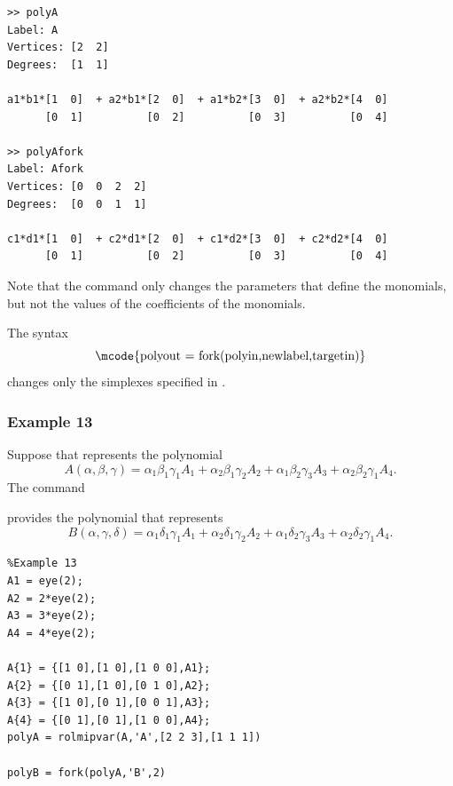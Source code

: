 \documentclass[english,11pt]{article}
\theoremstyle{break} \theorembodyfont{\small\rm}
\begin{document}
\begin{minipage}{14.5cm}
\begin{lstlisting}[rulecolor=\color{red}]
>> polyA
Label: A
Vertices: [2  2]
Degrees:  [1  1]

a1*b1*[1  0]  + a2*b1*[2  0]  + a1*b2*[3  0]  + a2*b2*[4  0]
      [0  1]          [0  2]          [0  3]          [0  4]

>> polyAfork
Label: Afork
Vertices: [0  0  2  2]
Degrees:  [0  0  1  1]

c1*d1*[1  0]  + c2*d1*[2  0]  + c1*d2*[3  0]  + c2*d2*[4  0]
      [0  1]          [0  2]          [0  3]          [0  4]
\end{lstlisting}
\end{minipage}
\vspace{0.2cm}


Note that the command  only changes the parameters that define the monomials, but not the
values of the coefficients of the monomials.

The syntax
\[
\mbox{\mcode{polyout = fork(polyin,newlabel,targetin)}}
\]
changes only the simplexes specified in .

\subsubsection*{Example 13}
Suppose that  represents the polynomial
\[
 A(\alpha,\beta,\gamma) = \alpha_1 \beta_1 \gamma_1 A_1 + \alpha_2 \beta_1 \gamma_2 A_2  + \alpha_1 \beta_2 \gamma_3 A_3 + \alpha_2 \beta_2 \gamma_1 A_4.
\]
The command

\vspace{0.5cm}%
\noindent\begin{minipage}{\linewidth}
\end{minipage}
\vspace{0.2cm}

provides the polynomial 
that represents
\[
 B(\alpha,\gamma,\delta) = \alpha_1 \delta_1 \gamma_1 A_1 + \alpha_2 \delta_1 \gamma_2 A_2  + \alpha_1 \delta_2 \gamma_3 A_3 + \alpha_2 \delta_2 \gamma_1 A_4.
\]

\begin{minipage}{9.5cm}
 \begin{lstlisting}
%Example 13
A1 = eye(2);
A2 = 2*eye(2);
A3 = 3*eye(2);
A4 = 4*eye(2);

A{1} = {[1 0],[1 0],[1 0 0],A1};
A{2} = {[0 1],[1 0],[0 1 0],A2};
A{3} = {[1 0],[0 1],[0 0 1],A3};
A{4} = {[0 1],[0 1],[1 0 0],A4};
polyA = rolmipvar(A,'A',[2 2 3],[1 1 1])

polyB = fork(polyA,'B',2)
 \end{lstlisting}
\end{minipage}
\vspace{0.2cm}
\end{document}
